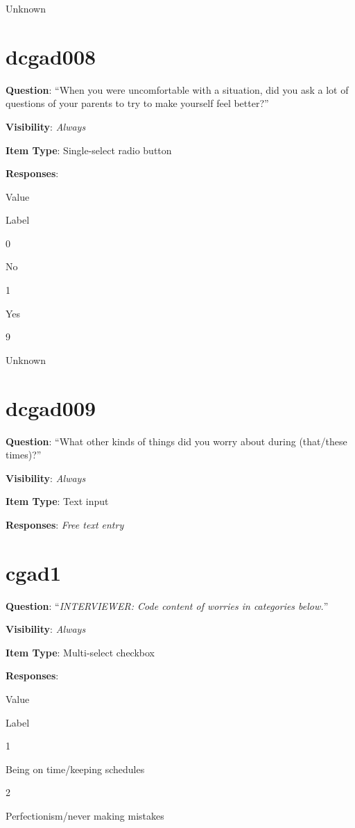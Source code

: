 \documentclass[]{book}
\begin{document}
Unknown

\hypertarget{dcgad008}{%
\section{dcgad008}\label{dcgad008}}

\textbf{Question}: ``When you were uncomfortable with a situation, did you ask a lot of questions of your parents to try to make yourself feel better?''

\textbf{Visibility}: \emph{Always}

\textbf{Item Type}: Single-select radio button

\textbf{Responses}:

Value

Label

0

No

1

Yes

9

Unknown

\hypertarget{dcgad009}{%
\section{dcgad009}\label{dcgad009}}

\textbf{Question}: ``What other kinds of things did you worry about during (that/these times)?''

\textbf{Visibility}: \emph{Always}

\textbf{Item Type}: Text input

\textbf{Responses}: \emph{Free text entry}

\hypertarget{cgad1}{%
\section{cgad1}\label{cgad1}}

\textbf{Question}: ``\emph{INTERVIEWER: Code content of worries in categories below.}''

\textbf{Visibility}: \emph{Always}

\textbf{Item Type}: Multi-select checkbox

\textbf{Responses}:

Value

Label

1

Being on time/keeping schedules

2

Perfectionism/never making mistakes
\end{document}
